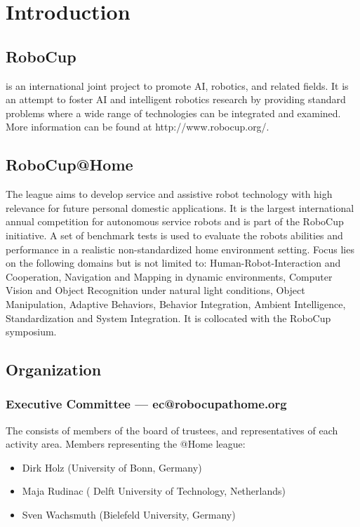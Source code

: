 \chapter{Introduction}
\label{chap:introduction}


\section{RoboCup}
 is an international joint project to promote AI, robotics, and related fields. It is an attempt to foster AI and intelligent robotics research by providing standard problems where a wide range of technologies can be integrated and examined. More information can be found at http://www.robocup.org/.

\section{RoboCup@Home}
The  league aims to develop service and assistive robot technology with high relevance for future personal domestic applications. It is the largest international annual competition for autonomous service robots and is part of the RoboCup initiative. A set of benchmark tests is used to evaluate the robots abilities and performance in a realistic non-standardized home environment setting. Focus lies on the following domains but is not limited to: Human-Robot-Interaction and Cooperation, Navigation and Mapping in dynamic environments, Computer Vision and Object Recognition under natural light conditions, Object Manipulation, Adaptive Behaviors, Behavior Integration, Ambient Intelligence, Standardization and System Integration. It is collocated with the RoboCup symposium.

\section{Organization}

\subsection{Executive Committee --- ec@robocupathome.org}
\label{sec:ec}
The  consists of members of the board of trustees, and representatives of each activity area. Members representing the @Home league:
\begin{itemize}
\item Dirk Holz (University of Bonn, Germany)
\item Maja Rudinac ( Delft University of Technology, Netherlands)
\item Sven Wachsmuth (Bielefeld University, Germany)
\end{itemize}

